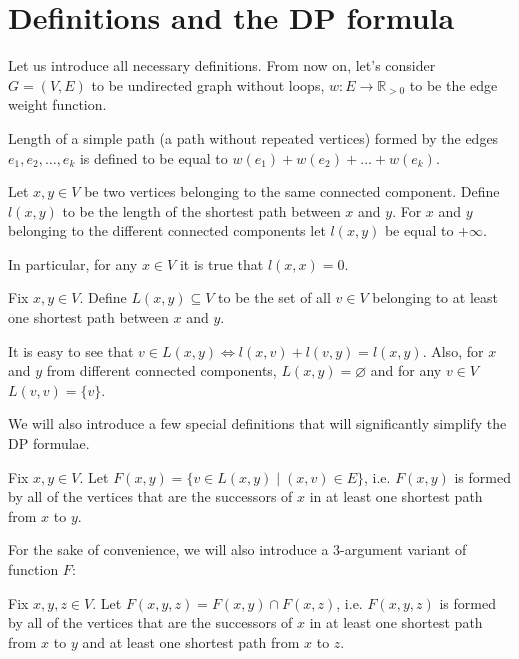 \section{Definitions and the DP formula}

Let us introduce all necessary definitions. From now on, let's consider $G = (V, E)$ to be undirected graph without loops, $w : E \rightarrow \mathbb{R}_{>0}$ to be the edge weight function. 

\begin{definition}
Length of a simple path (a path without repeated vertices) formed by the edges $e_1, e_2, \ldots, e_k$ is defined to be equal to $w(e_1) + w(e_2) + \ldots + w(e_k)$.
\end{definition}

\begin{definition} 
Let $x, y \in V$ be two vertices belonging to the same connected component. Define $l(x, y)$ to be the length of the shortest path between $x$ and $y$. For $x$ and $y$ belonging to the different connected components let $l(x, y)$ be equal to $+\infty$.
\end{definition}

In particular, for any $x \in V$ it is true that $l(x, x) = 0$.

\begin{definition} \label{is_between}
Fix $x, y \in V$. Define $L(x, y) \subseteq V$ to be the set of all $v \in V$ belonging to at least one shortest path between $x$ and $y$.
\end{definition}

It is easy to see that $v \in L(x, y) \Leftrightarrow l(x, v) + l(v, y) = l(x, y)$. Also, for $x$ and $y$ from different connected components, $L(x, y) = \varnothing$ and for any $v \in V$ $L(v, v) = \{v\}$.

We will also introduce a few special definitions that will significantly simplify the DP formulae.

\begin{definition}
Fix $x, y \in V$. Let $F(x, y) = \{v \in L(x, y) \mid (x, v) \in E\}$, i.e. $F(x, y)$ is formed by all of the vertices that are the successors of $x$ in at least one shortest path from $x$ to $y$. 
\end{definition}

For the sake of convenience, we will also introduce a 3-argument variant of function $F$: 

\begin{definition}
Fix $x, y, z \in V$. Let $F(x, y, z) = F(x, y) \cap F(x, z)$, i.e. $F(x, y, z)$ is formed by all of the vertices that are the successors of $x$ in at least one shortest path from $x$ to $y$ and at least one shortest path from $x$ to $z$.
\end{definition}

